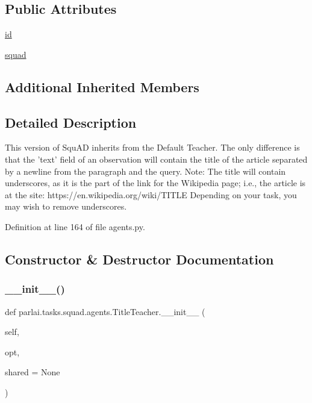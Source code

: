 \subsection*{Public Attributes}
\begin{DoxyCompactItemize}
\item 
\hyperlink{classparlai_1_1tasks_1_1squad_1_1agents_1_1TitleTeacher_afc29efc5cf9c9800f0cb5d9346b48f61}{id}
\item 
\hyperlink{classparlai_1_1tasks_1_1squad_1_1agents_1_1TitleTeacher_a416d2c1d7eb4e93ba1dc213cba6d2d26}{squad}
\end{DoxyCompactItemize}
\subsection*{Additional Inherited Members}


\subsection{Detailed Description}
\begin{DoxyVerb}This version of SquAD inherits from the Default Teacher. The only
difference is that the 'text' field of an observation will contain
the title of the article separated by a newline from the paragraph and the
query.
Note: The title will contain underscores, as it is the part of the link for
the Wikipedia page; i.e., the article is at the site:
https://en.wikipedia.org/wiki/{TITLE}
Depending on your task, you may wish to remove underscores.
\end{DoxyVerb}
 

Definition at line 164 of file agents.\+py.



\subsection{Constructor \& Destructor Documentation}
\mbox{\label{classparlai_1_1tasks_1_1squad_1_1agents_1_1TitleTeacher_a3d00faef86db6eb5b783b4aba4216daa}} 
\subsubsection{\texorpdfstring{\+\_\+\+\_\+init\+\_\+\+\_\+()}{\_\_init\_\_()}}
{\footnotesize\ttfamily def parlai.\+tasks.\+squad.\+agents.\+Title\+Teacher.\+\_\+\+\_\+init\+\_\+\+\_\+ (\begin{DoxyParamCaption}\item[{}]{self,  }\item[{}]{opt,  }\item[{}]{shared = {\ttfamily None} }\end{DoxyParamCaption})}



